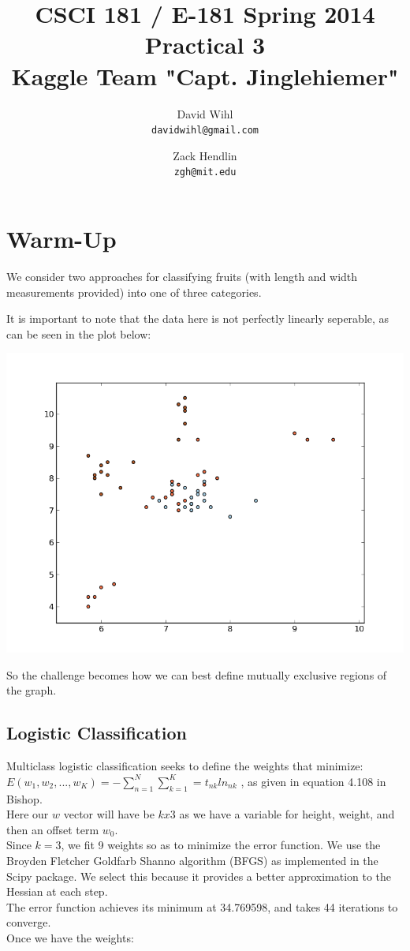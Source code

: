 \documentclass[11pt, oneside]{article}   	%
\title{CSCI 181 / E-181 Spring 2014 Practical 3 \\ 
{\large Kaggle Team "Capt. Jinglehiemer"}
}
\author{
  David Wihl\\
  \texttt{davidwihl@gmail.com}
  \and
  Zack Hendlin\\
  \texttt{zgh@mit.edu} 
}
\begin{document}
\maketitle
\section*{Warm-Up}

We consider two approaches for classifying fruits (with length and width measurements provided) into one of three categories.

It is important to note that the data here is not perfectly linearly seperable, as can be seen in the plot below:

\includegraphics[scale=.6]{figure_3}

So the challenge becomes how we can best define mutually exclusive regions of the graph.

\subsection*{Logistic Classification}

Multiclass logistic classification seeks to define the weights that minimize:
\\
 $E(w_1, w_2, ..., w_K) =  -\sum\limits_{n=1}^N \sum\limits_{k=1}^K = t_{nk} ln_{nk}$ , 
as given in equation 4.108 in Bishop.
\
\\
Here our $w$ vector will have be $k x 3$ as we have a variable for height, weight, and then an offset term $w_0$.
\
\\
Since $k=3$, we fit 9 weights so as to minimize the error function. We use the Broyden Fletcher Goldfarb Shanno algorithm (BFGS) as implemented in the Scipy package. We select this because it provides a better approximation to the Hessian at each step.
\
\\
The error function achieves its minimum at 34.769598, and takes 44 iterations to converge.
\\
Once we have the weights:
\end{document}
